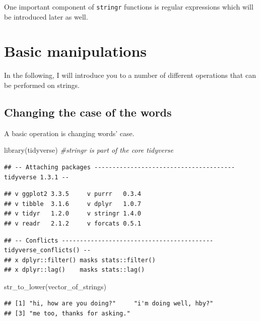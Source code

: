 \documentclass[
]{book}
\newenvironment{Shaded}{\begin{snugshade}}{\end{snugshade}}
\newcommand{\CommentTok}[1]{\textcolor[rgb]{0.56,0.35,0.01}{\textit{#1}}}
\newcommand{\FunctionTok}[1]{\textcolor[rgb]{0.00,0.00,0.00}{#1}}
\newcommand{\NormalTok}[1]{#1}
\begin{document}
One important component of \texttt{stringr} functions is regular expressions which will be introduced later as well.

\hypertarget{basic-manipulations}{%
\section{Basic manipulations}\label{basic-manipulations}}

In the following, I will introduce you to a number of different operations that can be performed on strings.

\hypertarget{changing-the-case-of-the-words}{%
\subsection{Changing the case of the words}\label{changing-the-case-of-the-words}}

A basic operation is changing words' case.

\begin{Shaded}
\begin{Highlighting}[]
\FunctionTok{library}\NormalTok{(tidyverse) }\CommentTok{\#stringr is part of the core tidyverse}
\end{Highlighting}
\end{Shaded}

\begin{verbatim}
## -- Attaching packages --------------------------------------- tidyverse 1.3.1 --
\end{verbatim}

\begin{verbatim}
## v ggplot2 3.3.5     v purrr   0.3.4
## v tibble  3.1.6     v dplyr   1.0.7
## v tidyr   1.2.0     v stringr 1.4.0
## v readr   2.1.2     v forcats 0.5.1
\end{verbatim}

\begin{verbatim}
## -- Conflicts ------------------------------------------ tidyverse_conflicts() --
## x dplyr::filter() masks stats::filter()
## x dplyr::lag()    masks stats::lag()
\end{verbatim}

\begin{Shaded}
\begin{Highlighting}[]
\FunctionTok{str\_to\_lower}\NormalTok{(vector\_of\_strings)}
\end{Highlighting}
\end{Shaded}

\begin{verbatim}
## [1] "hi, how are you doing?"     "i'm doing well, hby?"      
## [3] "me too, thanks for asking."
\end{verbatim}
\end{document}
